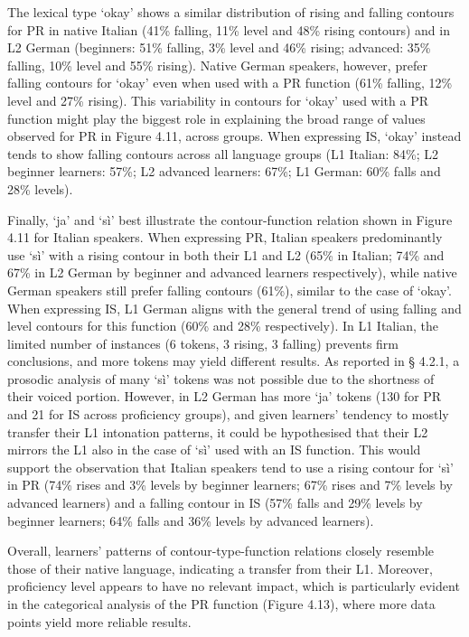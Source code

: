 \begin{styleStandard}
The lexical type ‘okay’ shows a similar distribution of rising and falling contours for PR in native Italian (41\% falling, 11\% level and 48\% rising contours) and in L2 German (beginners: 51\% falling, 3\% level and 46\% rising; advanced: 35\% falling, 10\% level and 55\% rising). Native German speakers, however, prefer falling contours for ‘okay’ even when used with a PR function (61\% falling, 12\% level and 27\% rising). This variability in contours for ‘okay’ used with a PR function might play the biggest role in explaining the broad range of values observed for PR in Figure 4.11, across groups. When expressing IS, ‘okay’ instead tends to show falling contours across all language groups (L1 Italian: 84\%; L2 beginner learners: 57\%; L2 advanced learners: 67\%; L1 German: 60\% falls and 28\% levels).
\end{styleStandard}

\begin{styleStandard}
Finally, ‘ja’ and ‘sì’ best illustrate the contour-function relation shown in Figure 4.11 for Italian speakers. When expressing PR, Italian speakers predominantly use ‘sì’ with a rising contour in both their L1 and L2 (65\% in Italian; 74\% and 67\% in L2 German by beginner and advanced learners respectively), while native German speakers still prefer falling contours (61\%), similar to the case of ‘okay’. When expressing IS, L1 German aligns with the general trend of using falling and level contours for this function (60\% and 28\% respectively). In L1 Italian, the limited number of instances (6 tokens, 3 rising, 3 falling) prevents firm conclusions, and more tokens may yield different results. As reported in § 4.2.1, a prosodic analysis of many ‘sì’ tokens was not possible due to the shortness of their voiced portion. However, in L2 German has more ‘ja’ tokens (130 for PR and 21 for IS across proficiency groups), and given learners’ tendency to mostly transfer their L1 intonation patterns, it could be hypothesised that their L2 mirrors the L1 also in the case of ‘sì’ used with an IS function. This would support the observation that Italian speakers tend to use a rising contour for ‘sì’ in PR (74\% rises and 3\% levels by beginner learners; 67\% rises and 7\% levels by advanced learners) and a falling contour in IS (57\% falls and 29\% levels by beginner learners; 64\% falls and 36\% levels by advanced learners).
\end{styleStandard}

\begin{styleStandard}
Overall, learners’ patterns of contour-type-function relations closely resemble those of their native language, indicating a transfer from their L1. Moreover, proficiency level appears to have no relevant impact, which is particularly evident in the categorical analysis of the PR function (Figure 4.13), where more data points yield more reliable results.
\end{styleStandard}

